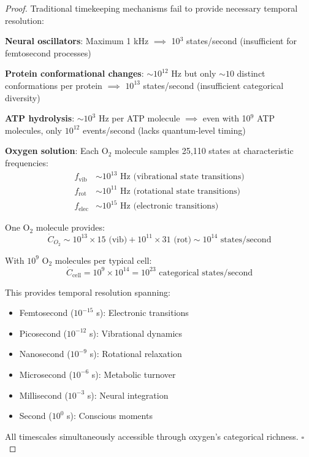 \begin{proof}
Traditional timekeeping mechanisms fail to provide necessary temporal resolution:

\textbf{Neural oscillators}: Maximum 1 kHz $\implies$ 10\(^3\) states/second (insufficient for femtosecond processes)

\textbf{Protein conformational changes}: $\sim 10^{12}$ Hz but only $\sim 10$ distinct conformations per protein $\implies$ $10^{13}$ states/second (insufficient categorical diversity)

\textbf{ATP hydrolysis}: $\sim 10^3$ Hz per ATP molecule $\implies$ even with 10\(^9\) ATP molecules, only $10^{12}$ events/second (lacks quantum-level timing)

\textbf{Oxygen solution}: Each O\(_2\) molecule samples 25,110 states at characteristic frequencies:
\begin{align}
f_{\text{vib}} &\sim 10^{13} \text{ Hz (vibrational state transitions)} \\
f_{\text{rot}} &\sim 10^{11} \text{ Hz (rotational state transitions)} \\
f_{\text{elec}} &\sim 10^{15} \text{ Hz (electronic transitions)}
\end{align}

One O\(_2\) molecule provides:
\begin{equation}
\dot{C}_{O_2} \sim 10^{13} \times 15 \text{ (vib)} + 10^{11} \times 31 \text{ (rot)} \sim 10^{14} \text{ states/second}
\end{equation}

With $10^9$ O\(_2\) molecules per typical cell:
\begin{equation}
\dot{C}_{\text{cell}} = 10^9 \times 10^{14} = 10^{23} \text{ categorical states/second}
\end{equation}

This provides temporal resolution spanning:
\begin{itemize}
\item Femtosecond ($10^{-15}$ s): Electronic transitions
\item Picosecond ($10^{-12}$ s): Vibrational dynamics
\item Nanosecond ($10^{-9}$ s): Rotational relaxation
\item Microsecond ($10^{-6}$ s): Metabolic turnover
\item Millisecond ($10^{-3}$ s): Neural integration
\item Second ($10^0$ s): Conscious moments
\end{itemize}

All timescales simultaneously accessible through oxygen's categorical richness. $\square$
\end{proof}

